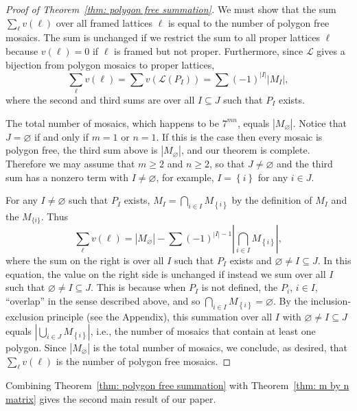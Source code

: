 \documentclass[12pt]{article}
\theoremstyle{plain}
\theoremstyle{remark}
\theoremstyle{definition}
\theoremstyle{remark}
\theoremstyle{definition}
\begin{document}
\begin{proof}[Proof of Theorem~\ref{thm: polygon free summation}]
We must show that the sum $\sum_{\ell}v\left(\ell\right)$ over all framed lattices $\ell$ is equal to the number of polygon free mosaics. The sum is unchanged if we restrict the sum to all proper lattices $\ell$ because $v\left(\ell\right)=0$ if $\ell$ is framed but not proper. Furthermore, since $\mathscr{L}$ gives a bijection from polygon mosaics to proper lattices, 
\[
\sum_{\ell}v\left(\ell\right)=\sum v\left(\mathscr{L}\left(P_{I}\right)\right)=\sum\left(-1\right)^{\left|I\right|}\left|M_{I}\right|,
\]
where the second and third sums are over all $I\subseteq J$ such that $P_{I}$ exists. 

The total number of mosaics, which happens to be $7^{mn}$, equals $\left|M_{\varnothing}\right|$. Notice that $J=\varnothing$ if and only if $m=1$ or $n=1$. If this is the case then every mosaic is polygon free, the third sum above is $\left|M_{\varnothing}\right|$, and our theorem is complete. Therefore we may assume that $m\ge2$ and $n\ge2$, so that $J\neq\varnothing$ and the third sum has a nonzero term with $I\neq\varnothing$, for example, $I=\left\{ i\right\} $ for any $i\in J$.

For any $I\neq\varnothing$ such that $P_{I}$ exists, $M_{I}=\bigcap_{i\in I}M_{\left\{ i\right\} }$ by the definition of $M_{I}$ and the $M_{\{i\}}$. Thus 
\[
\sum_{\ell}v\left(\ell\right)=\left|M_{\varnothing}\right|-\sum\left(-1\right)^{\left|I\right|-1}\left|\bigcap_{i\in I}M_{\left\{ i\right\} }\right|,
\]
 where the sum on the right is over all $I$ such that $P_{I}$ exists and $\varnothing\neq I\subseteq J$. In this equation, the value on the right side is unchanged if instead we sum over all $I$ such that $\varnothing\neq I\subseteq J$. This is because when $P_{I}$ is not defined, the $P_{i}$, $i\in I$, ``overlap'' in the sense described above, and so $\bigcap_{i\in I}M_{\left\{ i\right\} }=\varnothing$. By the inclusion-exclusion principle (see the Appendix), this summation over all $I$ with $\varnothing\neq I\subseteq J$ equals $\left|\bigcup_{i\in J}M_{\left\{ i\right\} }\right|$, i.e., the number of mosaics that contain at least one polygon. Since $\left|M_{\varnothing}\right|$ is the total number of mosaics, we conclude, as desired, that $\sum_{\ell}v\left(\ell\right)$ is the number of polygon free mosaics.
\end{proof}

Combining Theorem~\ref{thm: polygon free summation} with Theorem~\ref{thm: m by n matrix} gives the second main result of our paper.
    
\end{document}
